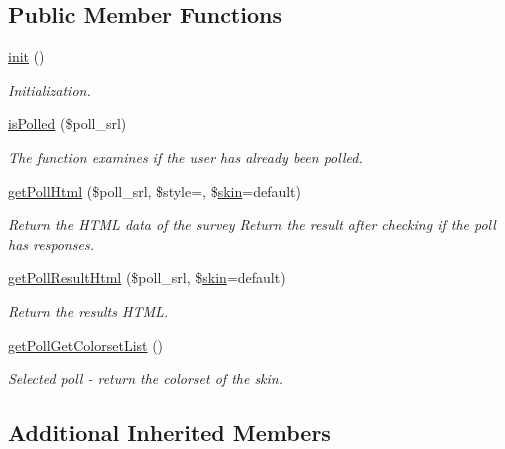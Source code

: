 \subsection*{Public Member Functions}
\begin{DoxyCompactItemize}
\item 
\hyperlink{classpollModel_a201866e44c1ba55917c57b15ae37f984}{init} ()
\begin{DoxyCompactList}\small\item\em Initialization. \end{DoxyCompactList}\item 
\hyperlink{classpollModel_a2364a327ffba2641db0722cdcf0c40d7}{is\+Polled} (\$poll\+\_\+srl)
\begin{DoxyCompactList}\small\item\em The function examines if the user has already been polled. \end{DoxyCompactList}\item 
\hyperlink{classpollModel_a75ba9768f206d9467f997beeb8c3e34e}{get\+Poll\+Html} (\$poll\+\_\+srl, \$style=\textquotesingle{}\textquotesingle{}, \$\hyperlink{ko_8install_8php_ab0f2b49fdb57754496b34f6b880cdeaf}{skin}=\textquotesingle{}default\textquotesingle{})
\begin{DoxyCompactList}\small\item\em Return the H\+T\+ML data of the survey Return the result after checking if the poll has responses. \end{DoxyCompactList}\item 
\hyperlink{classpollModel_a035246abbecec9462c8dbbab1b86bcd4}{get\+Poll\+Result\+Html} (\$poll\+\_\+srl, \$\hyperlink{ko_8install_8php_ab0f2b49fdb57754496b34f6b880cdeaf}{skin}=\textquotesingle{}default\textquotesingle{})
\begin{DoxyCompactList}\small\item\em Return the result\textquotesingle{}s H\+T\+ML. \end{DoxyCompactList}\item 
\hyperlink{classpollModel_a350de71f668751cd553fc60aca3fa72c}{get\+Poll\+Get\+Colorset\+List} ()
\begin{DoxyCompactList}\small\item\em Selected poll -\/ return the colorset of the skin. \end{DoxyCompactList}\end{DoxyCompactItemize}
\subsection*{Additional Inherited Members}


